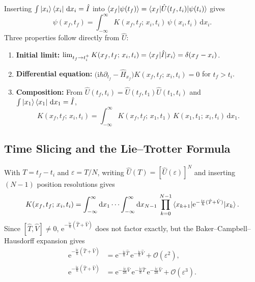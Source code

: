 \documentclass[11pt,a4paper]{article}
\newcommand{\ii}{\mathrm{i}}
\newcommand{\dd}{\mathrm{d}}
\newcommand{\ee}{\mathrm{e}}
\newcommand{\order}{\mathcal{O}}
\begin{document}
Inserting $\int\ket{x_i}\bra{x_i}\,\dd x_i = \hat I$ into $\braket{x_f|\psi(t_f)} = \braket{x_f|\hat U(t_f,t_i)|\psi(t_i)}$ gives
\begin{equation}
    \psi(x_f,t_f) = \int_{-\infty}^{\infty} K(x_f,t_f;\,x_i,t_i)\,\psi(x_i,t_i)\,\dd x_i.
\end{equation}
Three properties follow directly from $\hat U$:
\begin{enumerate}[leftmargin=1.5em, itemsep=2pt]
    \item \textbf{Initial limit:} $\lim_{t_f\to t_i^+} K(x_f,t_f;\,x_i,t_i) = \braket{x_f|\hat I|x_i} = \delta(x_f-x_i)$.
    \item \textbf{Differential equation:} $\bigl(\ii\hbar\partial_{t_f} - \hat H_{x_f}\bigr)K(x_f,t_f;\,x_i,t_i) = 0$ for $t_f > t_i$.
    \item \textbf{Composition:} From $\hat U(t_f,t_i) = \hat U(t_f,t_1)\hat U(t_1,t_i)$ and $\int\ket{x_1}\bra{x_1}\,\dd x_1 = \hat I$,
    \begin{equation}
        K(x_f,t_f;\,x_i,t_i) = \int_{-\infty}^{\infty} K(x_f,t_f;\,x_1,t_1)\,K(x_1,t_1;\,x_i,t_i)\,\dd x_1.
        \label{eq:composition-law}
    \end{equation}
\end{enumerate}

\subsection{Time Slicing and the Lie--Trotter Formula}

With $T = t_f - t_i$ and $\varepsilon = T/N$, writing $\hat U(T) = [\hat U(\varepsilon)]^N$ and inserting $(N-1)$ position resolutions gives
\begin{equation}
    K(x_f,t_f;\,x_i,t_i) = \int_{-\infty}^{\infty}\dd x_1\cdots\int_{-\infty}^{\infty}\dd x_{N-1}\,
    \prod_{k=0}^{N-1}\braket{x_{k+1}|\ee^{-\frac{\ii\varepsilon}{\hbar}(\hat T+\hat V)}|x_k}.
\end{equation}
Since $[\hat T,\hat V]\neq 0$, $\ee^{-\frac{\ii\varepsilon}{\hbar}(\hat T+\hat V)}$ does not factor exactly, but the Baker--Campbell--Hausdorff expansion gives
\begin{align}
    \ee^{-\frac{\ii\varepsilon}{\hbar}(\hat T+\hat V)}
    &= \ee^{-\frac{\ii\varepsilon}{\hbar}\hat T}\,\ee^{-\frac{\ii\varepsilon}{\hbar}\hat V} + \order(\varepsilon^2),
    \label{eq:trotter-1} \\
    \ee^{-\frac{\ii\varepsilon}{\hbar}(\hat T+\hat V)}
    &= \ee^{-\frac{\ii\varepsilon}{2\hbar}\hat V}\,\ee^{-\frac{\ii\varepsilon}{\hbar}\hat T}\,\ee^{-\frac{\ii\varepsilon}{2\hbar}\hat V} + \order(\varepsilon^3).
    \label{eq:trotter-2}
\end{align}
\end{document}
